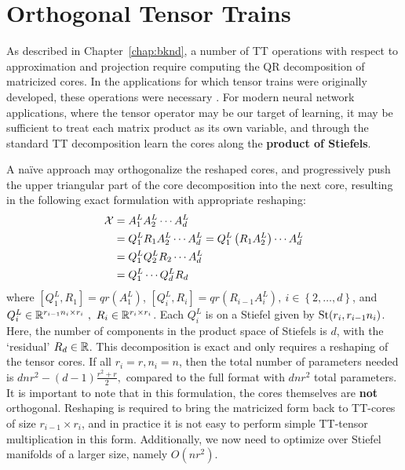 \section{Orthogonal Tensor Trains}\label{sec:ott}
As described in Chapter~\ref{chap:bknd}, a number of TT operations with respect to approximation and projection require computing the QR decomposition of matricized cores. In the applications for which tensor trains were originally developed, these operations were necessary \citep{oseledets2011tensor,klus2018tensor}. For modern neural network applications, where the tensor operator may be our target of learning, it may be sufficient to treat each matrix product as its own variable, and through the standard TT decomposition learn the cores along the \textbf{product of Stiefels}.

A na\"ive approach may orthogonalize the reshaped cores, and progressively push the upper triangular part of the core decomposition into the next core, resulting in the following exact formulation with appropriate reshaping:
\begin{align}
    \mathcal{X} &= A_1^L A_2^L\cdots A_d^L \nonumber\\
    &= Q_1^L R_1 A_2^L \cdots A_d^L = Q_1^L \left(R_1 A_2^L\right) \cdots A_d^L \nonumber\\ 
    &= Q_1^L Q_2^L R_2 \cdots A_d^L \nonumber\\
    &= Q_1^L \cdots Q_d^L R_d \label{eq:eott}
\end{align}
where $ [Q_1^L, R_1] = qr(A_1^L) $, $ [Q_i^L, R_i] = qr(R_{i-1} A_i^L ), \ i \in \left \{2,\ldots,d \right \}$, and $ Q_i^L \in \mathbb{R}^{r_{i-1} n_i \times r_i} \ ,\ R_i \in \mathbb{R}^{r_i \times r_i} $. 
Each $Q_i^L$ is on a Stiefel given by $\text{St}(r_i, r_{i-1}n_i)$. Here, the number of components in the product space of Stiefels is $d$, with the `residual' $R_d \in \mathbb{R}$. This decomposition is exact and only requires a reshaping of the tensor cores.
If all $r_i = r, n_i = n$,
then the total number of parameters needed is
$    d n r^2 - (d-1)\frac{r^2 + r}{2},$
compared to the full format with $dnr^2$ total parameters.
It is important to note that in this formulation, the cores themselves are \textbf{not} orthogonal. Reshaping is required to bring the matricized form back to TT-cores of size $r_{i-1} \times r_i$, and in practice it is not easy to perform simple TT-tensor multiplication in this form. Additionally, we now need to optimize over Stiefel manifolds of a larger size, namely $O(nr^2)$.


